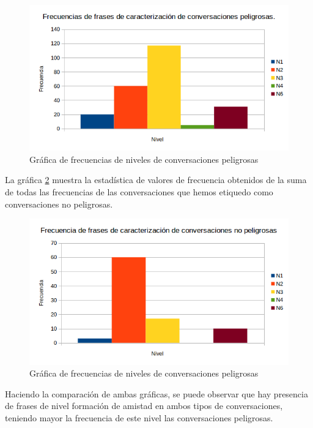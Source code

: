 \begin{figure}[h]
\begin{center}
\includegraphics[scale=1]{images/graficanivelespeligrosas}
\caption{Gr\'afica de frecuencias de niveles de conversaciones peligrosas}
\label{fig:graficapeligrosa}
\end{center}
\end{figure}

La gr\'afica \ref{fig:graficanopeligrosa} muestra la estad\'istica de valores de frecuencia obtenidos de la suma de todas las frecuencias de las conversaciones que hemos etiquedo como conversaciones no peligrosas. 

\begin{figure}[h]
\begin{center}
\includegraphics[scale=1]{images/graficanivelesnopeligrosas}
\caption{Gr\'afica de frecuencias de niveles de conversaciones peligrosas}
\label{fig:graficanopeligrosa}
\end{center}
\end{figure}

Haciendo la comparaci\'on de ambas gr\'aficas, se puede observar que  hay presencia de frases de nivel formaci\'on de amistad en ambos tipos de conversaciones, teniendo mayor la frecuencia de este nivel las conversaciones peligrosas.  

